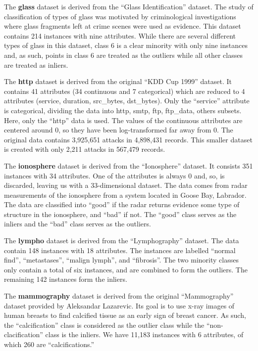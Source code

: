 \documentclass{article}
\begin{document}
The \textbf{glass} dataset is derived from the ``Glass Identification'' dataset.
The study of classification of types of glass was motivated by criminological investigations where glass fragments left at crime scenes were used as evidence.
This dataset contains 214 instances with nine attributes.
While there are several different types of glass in this dataset, class 6 is a clear minority with only nine instances and, as such, points in class 6 are treated as the outliers while all other classes are treated as inliers.

The \textbf{http} dataset is derived from the original ``KDD Cup 1999'' dataset.
It contains 41 attributes (34 continuous and 7 categorical) which are reduced to 4 attributes (service, duration, src\_bytes, dst\_bytes).
Only the ``service'' attribute is categorical, dividing the data into {http, smtp, ftp, ftp\_data, others} subsets.
Here, only the ``http'' data is used.
The values of the continuous attributes are centered around 0, so they have been log-transformed far away from 0.
The original data contains 3,925,651 attacks in 4,898,431 records.
This smaller dataset is created with only 2,211 attacks in 567,479 records.

The \textbf{ionosphere} dataset is derived from the ``Ionosphere'' dataset.
It consists 351 instances with 34 attributes.
One of the attributes is always 0 and, so, is discarded, leaving us with a 33-dimensional dataset.
The data comes from radar measurements of the ionosphere from a system located in Goose Bay, Labrador.
The data are classified into ``good'' if the radar returns evidence some type of structure in the ionosphere, and ``bad'' if not.
The ``good'' class serves as the inliers and the ``bad'' class serves as the outliers.

The \textbf{lympho} dataset is derived from the ``Lymphography'' dataset.
The data contain 148 instances with 18 attributes.
The instances are labelled ``normal find'', ``metastases'', ``malign lymph'', and ``fibrosis''.
The two minority classes only contain a total of six instances, and are combined to form the outliers.
The remaining 142 instances form the inliers.

The \textbf{mammography} dataset is derived from the original ``Mammography'' dataset provided by Aleksandar Lazarevic.
Its goal is to use x-ray images of human breasts to find calcified tissue as an early sign of breast cancer.
As such, the ``calcification'' class is considered as the outlier class while the ``non-clacification'' class is the inliers.
We have 11,183 instances with 6 attributes, of which 260 are ``calcifications.''
\end{document}
